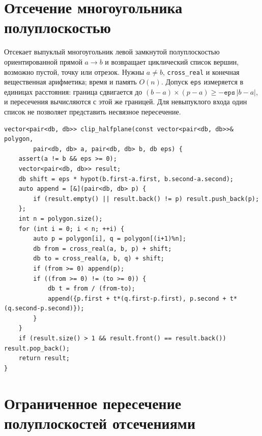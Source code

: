 \section{Отсечение многоугольника полуплоскостью}
Отсекает выпуклый многоугольник левой замкнутой полуплоскостью ориентированной прямой $a\to b$ и возвращает циклический список вершин, возможно пустой, точку или отрезок.
Нужны $a\ne b$, \texttt{cross\_real} и конечная вещественная арифметика; время и память $O(n)$.
Допуск \texttt{eps} измеряется в единицах расстояния: граница сдвигается до $(b-a)\times(p-a)\ge-\texttt{eps}\,|b-a|$, и пересечения вычисляются с этой же границей.
Для невыпуклого входа один список не позволяет представить несвязное пересечение.
\begin{lstlisting}[name=geometry_clipping]
vector<pair<db, db>> clip_halfplane(const vector<pair<db, db>>& polygon,
        pair<db, db> a, pair<db, db> b, db eps) {
    assert(a != b && eps >= 0);
    vector<pair<db, db>> result;
    db shift = eps * hypot(b.first-a.first, b.second-a.second);
    auto append = [&](pair<db, db> p) {
        if (result.empty() || result.back() != p) result.push_back(p);
    };
    int n = polygon.size();
    for (int i = 0; i < n; ++i) {
        auto p = polygon[i], q = polygon[(i+1)%n];
        db from = cross_real(a, b, p) + shift;
        db to = cross_real(a, b, q) + shift;
        if (from >= 0) append(p);
        if ((from >= 0) != (to >= 0)) {
            db t = from / (from-to);
            append({p.first + t*(q.first-p.first), p.second + t*(q.second-p.second)});
        }
    }
    if (result.size() > 1 && result.front() == result.back()) result.pop_back();
    return result;
}
\end{lstlisting}
\fi

%

\iffalse
\section{Ограниченное пересечение полуплоскостей отсечениями}
